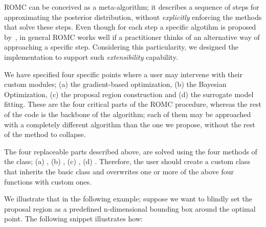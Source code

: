 ROMC can be conceived as a meta-algorithm; it describes a sequence of
steps for approximating the posterior distribution, without
\emph{explicitly} enforcing the methods that solve these steps. Even
though for each step a specific algotihm is proposed
by~\cite{Ikonomov2019}, in general ROMC works well if a practitioner
thinks of an alternative way of approaching a specific
step. Considering this particularity, we designed the implementation
to support such \emph{extensibility} capability.

We have specified four specific points where a user may intervene with
their custom modules; (a) the gradient-based optimization, (b) the
Bayesian Optimization, (c) the proposal region construction and (d)
the surrogate model fitting. These are the four critical parts of the
ROMC procedure, whereas the rest of the code is the backbone of the
algorithm; each of them may be approached with a completely different
algorithm than the one we propose, without the rest of the method to
collapse.

The four replaceable parts described above, are solved using the four
methods of the \linebreak {} class; (a)
, (b) ,
\linebreak (c) , (d)
. Therefore, the user should
create a custom class that inherits the basic
 class and overwrites one or more of the
above four functions with custom ones.

We illustrate that in the
following example; suppose we want to blindly set the proposal region
as a predefined n-dimensional bounding box around the optimal
point. The following snippet illustrates how:

